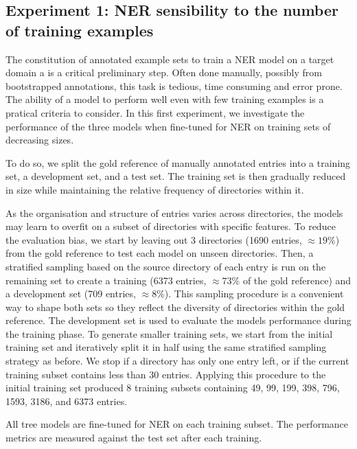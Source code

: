 \subsection{Experiment 1: NER sensibility to the number of training examples}
\label{subsection:experiment-1-setup}
The constitution of annotated example sets to train a NER model on a target domain a is a critical preliminary step.
Often done manually, possibly from bootstrapped annotations, this task is tedious, time consuming and error prone.
The ability of a model to perform well even with few training examples is a pratical criteria to consider.
In this first experiment, we investigate the performance of the three models when fine-tuned for NER on training sets of decreasing sizes.

To do so, we split the gold reference of manually annotated entries into a training set, a development set, and a test set. 
The training set is then gradually reduced in size while maintaining the relative frequency of directories within it.

As the organisation and structure of entries varies across directories, the models may learn to overfit on a subset of directories with specific features.
To reduce the evaluation bias, we start by leaving out 3 directories (1690 entries, $\approx 19\%$) from the gold reference to test each model on unseen directories.
Then, a stratified sampling based on the source directory of each entry is run on the remaining set to create a training (6373 entries, $\approx 73\%$ of the gold reference) and a development set (709 entries, $\approx 8\%$).
This sampling procedure is a convenient way to shape both sets so they reflect the diversity of directories within the gold reference.
The development set is used to evaluate the models performance during the training phase.
To generate smaller training sets, we start from the initial training set and iteratively split it in half using the same stratified sampling strategy as before.
We stop if a directory has only one entry left, or if the current training subset contains less than 30 entries.
Applying this procedure to the initial training set produced 8 training subsets containing 49, 99, 199, 398, 796, 1593, 3186, and 6373 entries.

All tree models are fine-tuned for NER on each training subset.
The performance metrics are measured against the test set after each training.




